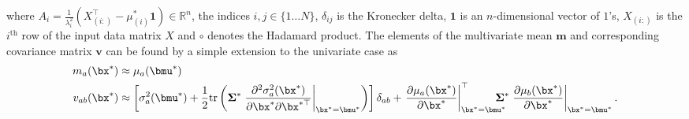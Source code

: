 where $A_i = \tfrac{1}{\lambda_i^2}(X_{(i:)}^\top - {\mu^*_{(i)}}\mathbf{1}) \in \mathbb{R}^{n}$, the indices $i,j \in \{1\dots N\}$, $\delta_{ij}$ is the Kronecker delta, $\mathbf{1}$ is an $n$-dimensional vector of $1$'s, $X_{(i:)}$ is the $i^{\text{th}}$ row of the input data matrix $X$ and $\circ$ denotes the Hadamard product. The elements of the multivariate mean $\mathbf{m}$ and corresponding covariance matrix $\mathbf{v}$ can be found by a simple extension to the univariate case as
\begin{align} 
m_a(\bx^*) &\approx  \mu_a(\bmu^*) \label{TaylorM}\\
v_{ab}(\bx^*) &\approx  \left[
\sigma_a^2(\bmu^*)  + 
\frac{1}{2}\mathrm{tr} \left( \mathbf{\Sigma}^*
\left.\frac{\partial^2\sigma_a^2(\bx^*)}{\partial\bx^*\partial\bx^{*\top}}\right|_{\bx^*=\bmu^*} \right) \right] \delta_{ab}  
+
\left.\frac{\partial\mu_a(\bx^*)}{\partial\bx^*}\right|_{\bx^*=\bmu^*}^\top
\!\!\!\!\!\!\!\mathbf{\Sigma}^*
\left.\frac{\partial\mu_b(\bx^*)}{\partial\bx^*}\right|_{\bx^*=\bmu^*}.   \label{TaylorV}
\end{align}








